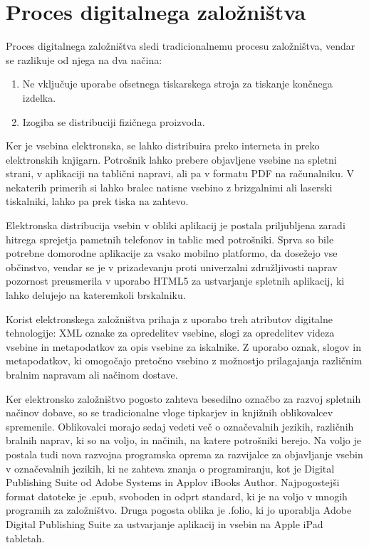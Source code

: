 \documentclass[a4paper, 12pt]{book}
\begin{document}
\section{Proces digitalnega založništva}
Proces digitalnega založništva sledi tradicionalnemu procesu založništva,\cite{5} vendar se razlikuje od njega na dva načina: 
\begin{enumerate}
	\item Ne vključuje uporabe ofsetnega tiskarskega stroja za tiskanje končnega izdelka.
	\item Izogiba se distribuciji fizičnega proizvoda.
\end{enumerate}
Ker je vsebina elektronska, se lahko distribuira preko interneta in preko elektronskih knjigarn. Potrošnik lahko prebere objavljene vsebine na spletni strani, v aplikaciji na tablični napravi, ali pa v formatu PDF na računalniku. V nekaterih primerih si lahko bralec natisne vsebino z brizgalnimi ali laserski tiskalniki, lahko pa prek tiska na zahtevo. 

Elektronska distribucija vsebin v obliki aplikacij je postala priljubljena zaradi hitrega sprejetja pametnih telefonov in tablic med potrošniki. Sprva so bile potrebne domorodne aplikacije za vsako mobilno platformo, da dosežejo vse občinstvo, vendar se je v prizadevanju proti univerzalni združljivosti naprav pozornost preusmerila v uporabo HTML5 za ustvarjanje spletnih aplikacij, ki lahko delujejo na kateremkoli brskalniku.

Korist elektronskega založništva prihaja z uporabo treh atributov digitalne tehnologije: XML oznake za opredelitev vsebine,\cite{6} slogi za opredelitev videza vsebine in metapodatkov za opis vsebine za iskalnike. Z uporabo oznak, slogov in metapodatkov, ki omogočajo pretočno vsebino z možnostjo prilagajanja različnim bralnim napravam ali načinom dostave. 

Ker elektronsko založništvo pogosto zahteva besedilno označbo za razvoj spletnih načinov dobave, so se tradicionalne vloge tipkarjev in knjižnih oblikovalcev spremenile. Oblikovalci morajo sedaj vedeti več o označevalnih jezikih, različnih bralnih naprav, ki so na voljo, in načinih, na katere potrošniki berejo. Na voljo je postala tudi nova razvojna programska oprema za razvijalce za objavljanje vsebin v označevalnih jezikih, ki ne zahteva znanja o programiranju, kot je Digital Publishing Suite od Adobe Systems in Applov iBooks Author. Najpogostejši format datoteke je .epub, svoboden in odprt standard, ki je na voljo v mnogih programih za založništvo. Druga pogosta oblika je .folio, ki jo uporablja Adobe Digital Publishing Suite za ustvarjanje aplikacij in vsebin na Apple iPad tabletah. 
\end{document}
